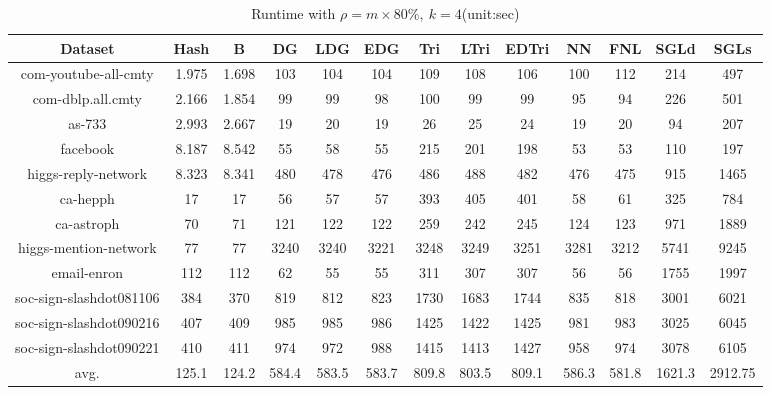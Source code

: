 \documentclass{sig-alternate-2013}
\begin{document}
\begin{table}[!hpp]
\centering
\caption{Runtime with $\rho = m\times 80\%,\ k=4$(unit:sec)}
\begin{tabular}{ccccccccccccc}
\hline
Dataset                     &Hash       &B          &DG         &LDG        &EDG        &Tri        &LTri       &EDTri      &NN         &FNL        &SGLd   &SGLs\\
\hline
com-youtube-all-cmty		&1.975		&1.698		&103		&104		&104		&109		&108		&106		&100		&112		&214		&497\\
com-dblp.all.cmty			&2.166		&1.854		&99 		&99		    &98		    &100		&99   		&99   		&95   		&94		    &226		&501\\
as-733						&2.993		&2.667		&19	    	&20		    &19		    &26  		&25		    &24		    &19		    &20		    &94		    &207\\
facebook					&8.187		&8.542		&55		    &58		    &55		    &215		&201		&198		&53		    &53	     	&110		&197\\
higgs-reply-network			&8.323		&8.341		&480		&478		&476		&486		&488		&482		&476		&475		&915		&1465\\
ca-hepph		            &17	      	&17    		&56		    &57		    &57		    &393		&405		&401		&58		    &61		    &325  		&784\\
ca-astroph		            &70		    &71		    &121		&122		&122		&259		&242		&245		&124		&123		&971		&1889\\
higgs-mention-network		&77		    &77		    &3240		&3240		&3221		&3248		&3249		&3251		&3281		&3212		&5741		&9245\\
email-enron		            &112		&112		&62		    &55		    &55		    &311		&307		&307		&56		    &56	     	&1755		&1997\\
soc-sign-slashdot081106		&384		&370		&819		&812		&823		&1730		&1683		&1744		&835		&818		&3001		&6021\\
soc-sign-slashdot090216		&407		&409		&985		&985		&986		&1425		&1422		&1425		&981		&983		&3025		&6045\\
soc-sign-slashdot090221		&410		&411		&974		&972		&988		&1415		&1413		&1427		&958		&974		&3078		&6105\\
\hline
avg.                        &125.1	    &124.2   	&584.4	    &583.5  	&583.7     	&809.8	    &803.5	    &809.1	    &586.3	    &581.8	    &1621.3	    &2912.75\\
\hline
\end{tabular}
\end{table}
\end{document}
